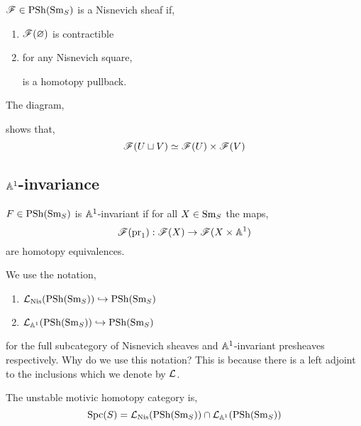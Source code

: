 \documentclass[12pt]{article}
\begin{document}
\begin{defn}
$\mathscr{F} \in \mathrm{PSh}(\mathrm{Sm}_S)$ is a Nisnevich sheaf if,
\begin{enumerate}
\item $\mathscr{F}(\varnothing)$ is contractible
\item for any Nisnevich square,
\begin{center}
\end{center}
is a homotopy pullback. 
\end{enumerate}
\end{defn}

\begin{rmk}
The diagram,
\begin{center}
\end{center}
shows that,
\[ \mathscr{F}(U \sqcup V) \simeq \mathscr{F}(U) \times \mathscr{F}(V) \]
\end{rmk}

\subsection{$\mathbb{A}^1$-invariance}

\begin{defn}
$F \in \mathrm{PSh}(\mathrm{Sm}_S)$ is $\mathbb{A}^1$-invariant if for all $X \in \mathrm{Sm}_S$  the maps,
\[ \mathscr{F}(\mathrm{pr}_1) : \mathscr{F}(X) \to \mathscr{F}(X \times \mathbb{A}^1) \]
are homotopy equivalences.
\end{defn}

\begin{rmk}
We use the notation,
\begin{enumerate}
\item $\mathcal{L}_{\mathrm{Nis}}(\mathrm{PSh}(\mathrm{Sm}_S)) \hookrightarrow \mathrm{PSh}(\mathrm{Sm}_S)$
\item $\mathcal{L}_{\mathbb{A}^1}(\mathrm{PSh}(\mathrm{Sm}_S)) \hookrightarrow \mathrm{PSh}(\mathrm{Sm}_S)$
\end{enumerate}
for the full subcategory of Nisnevich sheaves and $\mathbb{A}^1$-invariant presheaves respectively. Why do we use this notation? This is because there is a left adjoint to the inclusions which we denote by $\mathcal{L}$.
\end{rmk}

\begin{defn}
The unstable motivic homotopy category is,
\[ \mathrm{Spc}(S) = \mathcal{L}_{\mathrm{Nis}}(\mathrm{PSh}(\mathrm{Sm}_S)) \cap \mathcal{L}_{\mathbb{A}^1}(\mathrm{PSh}(\mathrm{Sm}_S)) \]
\end{defn}
\end{document}
